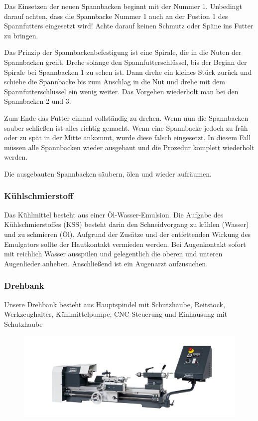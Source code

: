 \documentclass{\basedir/fablab-document}
\begin{document}
Das Einsetzen der neuen Spannbacken beginnt mit der Nummer 1.
Unbedingt darauf achten, dass die Spannbacke Nummer 1 auch an der Postion 1 des Spannfutters eingesetzt wird!
Achte darauf keinen Schmutz oder Späne ins Futter zu bringen.

Das Prinzip der Spannbackenbefestigung ist eine Spirale, die in die Nuten der Spannbacken greift.
Drehe solange den Spannfutterschlüssel, bis der Beginn der Spirale bei Spannbacken 1 zu sehen ist.
Dann drehe ein kleines Stück zurück und schiebe die Spannbacke bis zum Anschlag in die Nut und drehe mit dem Spannfutterschlüssel ein wenig weiter.
Das Vorgehen wiederholt man bei den Spannbacken 2 und 3.

Zum Ende das Futter einmal vollständig zu drehen.
Wenn nun die Spannbacken sauber schließen ist alles richtig gemacht.
Wenn eine Spannbacke jedoch zu früh oder zu spät in der Mitte ankommt, wurde diese falsch eingesetzt.
In diesem Fall müssen alle Spannbacken wieder ausgebaut und die Prozedur komplett wiederholt werden.

Die ausgebauten Spannbacken säubern, ölen und wieder aufräumen.

\subsubsection{Kühlschmierstoff}

Das Kühlmittel besteht aus einer Öl-Wasser-Emulsion.
Die Aufgabe des Kühlschmierstoffes (KSS) besteht darin den Schneidvorgang zu kühlen (Wasser) und zu schmieren (Öl).
Aufgrund der Zusätze und der entfettenden Wirkung des Emulgators sollte der Hautkontakt vermieden werden.
Bei Augenkontakt sofort mit reichlich Wasser ausspülen und gelegentlich die oberen und unteren Augenlieder anheben.
Anschließend ist ein Augenarzt aufzusuchen.

\subsubsection{Drehbank}
Unsere Drehbank besteht aus Hauptspindel mit Schutzhaube, Reitstock, Werkzeughalter, Kühlmittelpumpe, CNC-Steuerung und Einhausung mit Schutzhaube
\begin{figure}[ht]
\centering
\includegraphics[width = 0.9\linewidth]{img/drehbank} \\
\end{figure}
\end{document}
